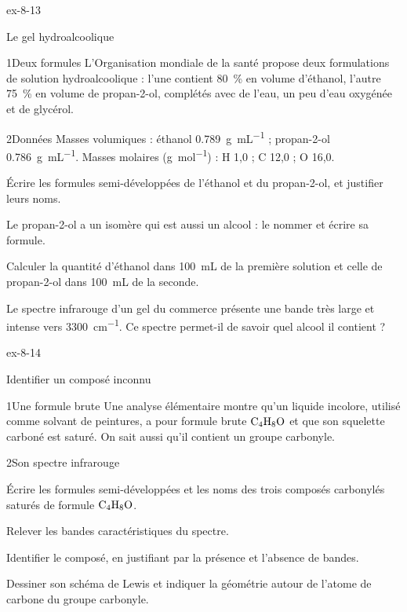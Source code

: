 \begin{blocLivre}{ex-8-13}
\begin{exercice}[3]{Le gel hydroalcoolique}
\begin{docu}{1}{Deux formules}
L'Organisation mondiale de la santé propose deux formulations de solution hydroalcoolique : l'une contient \qty{80}{\percent} en volume
d'éthanol, l'autre \qty{75}{\percent} en volume de propan-2-ol, complétés avec de l'eau, un peu d'eau oxygénée et de glycérol.
\end{docu}
\begin{docu}{2}{Données}
Masses volumiques : éthanol \qty{0,789}{g.mL^{-1}} ; propan-2-ol \qty{0,786}{g.mL^{-1}}. Masses molaires (\unit{g.mol^{-1}}) : H 1,0 ; C 12,0 ; O 16,0.
\end{docu}
\begin{questions}
\item Écrire les formules semi-développées de l'éthanol et du propan-2-ol, et justifier leurs noms.
\item Le propan-2-ol a un isomère qui est aussi un alcool : le nommer et écrire sa formule.
\item Calculer la quantité d'éthanol dans \qty{100}{mL} de la première solution et celle de propan-2-ol dans \qty{100}{mL} de la seconde.
\item \initiative Le spectre infrarouge d'un gel du commerce présente une bande très large et intense vers \qty{3300}{cm^{-1}}. Ce spectre
permet-il de savoir quel alcool il contient ?
\end{questions}
\end{exercice}
\end{blocLivre}
\begin{blocLivre}{ex-8-14}
\begin{exercice}[3]{Identifier un composé inconnu}
\begin{docu}{1}{Une formule brute}
Une analyse élémentaire montre qu'un liquide incolore, utilisé comme solvant de peintures, a pour formule brute $\ce{C4H8O}$
et que son squelette carboné est saturé. On sait aussi qu'il contient un groupe carbonyle.
\end{docu}
\begin{docu}{2}{Son spectre infrarouge}
\end{docu}
\begin{questions}
\item Écrire les formules semi-développées et les noms des trois composés carbonylés saturés de formule $\ce{C4H8O}$.
\item Relever les bandes caractéristiques du spectre.
\item \initiative Identifier le composé, en justifiant par la présence et l'absence de bandes.
\item Dessiner son schéma de Lewis et indiquer la géométrie autour de l'atome de carbone du groupe carbonyle.
\end{questions}
\end{exercice}
\end{blocLivre}
